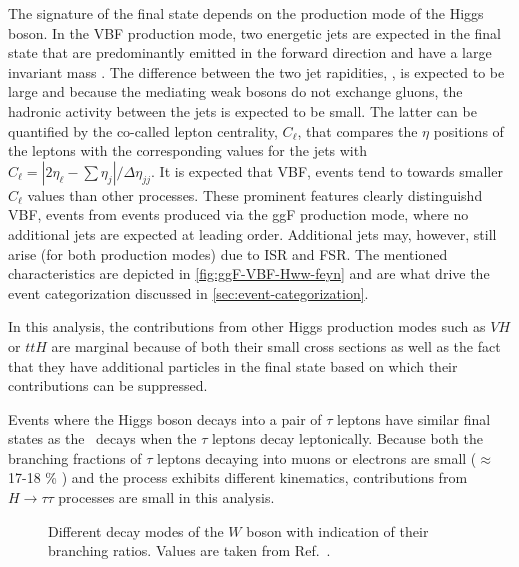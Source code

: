 The signature of the final state depends on the production mode of the Higgs boson.
In the VBF production mode, two energetic jets are expected in the final state that are predominantly emitted in the forward direction and have a large invariant mass \mjj. 
The difference between the two jet rapidities, \dyjj, is expected to be large and because the mediating weak bosons do not exchange gluons, the hadronic activity between the jets is expected to be small. 
The latter can be quantified by the co-called lepton centrality, $C_\ell$, that compares the $\eta$ positions of the leptons with the corresponding values for the jets with $C_\ell = |2\eta_\ell - \sum \eta_j| / \Delta \eta_{jj}$. It is expected that VBF, \HWW events tend to towards smaller $C_\ell$ values than other processes.
These prominent features clearly distinguishd VBF, \HWW events from events produced via the ggF production mode, where no additional jets are expected at leading order. Additional jets may, however, still arise (for both production modes) due to ISR and FSR. The mentioned characteristics are depicted in \cref{fig:ggF-VBF-Hww-feyn} and are what drive the event categorization discussed in \cref{sec:event-categorization}. 

In this analysis, the contributions from other Higgs production modes such as $VH$ or $ttH$ are marginal because of both their small cross sections as well as the fact that they have additional particles in the final state based on which their contributions can be suppressed.

Events where the Higgs boson decays into a pair of $\tau$ leptons have similar final states as the \HWWdet\ decays when the $\tau$ leptons decay leptonically. 
Because both the branching fractions of $\tau$ leptons decaying into muons or electrons are small ($\approx$ 17-18 \% \cite{PDG2020}) and the process exhibits different kinematics, contributions from $H \to \tau\tau$ processes are small in this analysis. 


\begin{figure}
    \caption[Different decay modes of the $W$ boson with indication of their branching ratios.]{Different decay modes of the $W$ boson with indication of their branching ratios. Values are taken from Ref.~\cite{PDG2020}.}
    \label{fig:w-branching-ratios}
\end{figure}

